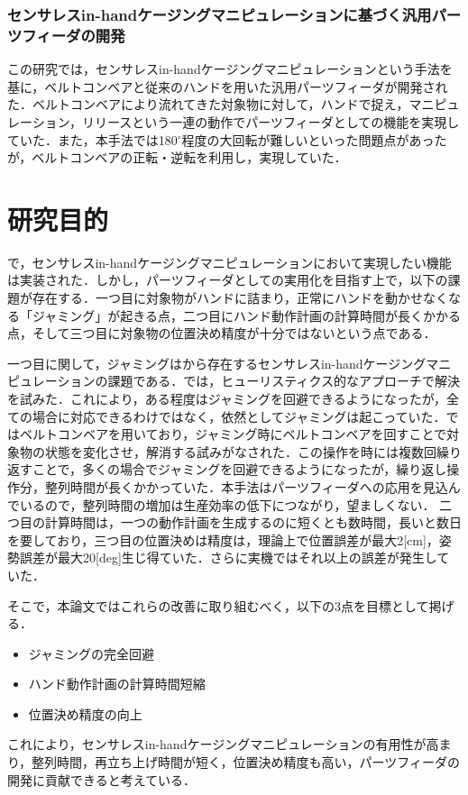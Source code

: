 \documentclass[a4paper,twoside,12pt,papersize, dvipdfmx]{iirthesis}
\begin{document}
\subsubsection{センサレスin-handケージングマニピュレーションに基づく汎用パーツフィーダの開発 \cite{Kamikukita2022}}
この研究では，センサレスin-handケージングマニピュレーションという手法を基に，ベルトコンベアと従来のハンドを用いた汎用パーツフィーダが開発された．ベルトコンベアにより流れてきた対象物に対して，ハンドで捉え，マニピュレーション，リリースという一連の動作でパーツフィーダとしての機能を実現していた．また，本手法では180$^\circ$程度の大回転が難しいといった問題点があったが，ベルトコンベアの正転・逆転を利用し，実現していた．

\section{研究目的}\label{sec::intro::objective}
\cite{komiyama2020}で，センサレスin-handケージングマニピュレーションにおいて実現したい機能は実装された．しかし，パーツフィーダとしての実用化を目指す上で，以下の課題が存在する．一つ目に対象物がハンドに詰まり，正常にハンドを動かせなくなる「ジャミング」が起きる点，二つ目にハンド動作計画の計算時間が長くかかる点，そして三つ目に対象物の位置決め精度が十分ではないという点である．\par

一つ目に関して，ジャミングは\cite{asamura2013}から存在するセンサレスin-handケージングマニピュレーションの課題である．\cite{komiyama2020}では，ヒューリスティクス的なアプローチで解決を試みた．これにより，ある程度はジャミングを回避できるようになったが，全ての場合に対応できるわけではなく，依然としてジャミングは起こっていた．\cite{kamikukita2021}ではベルトコンベアを用いており，ジャミング時にベルトコンベアを回すことで対象物の状態を変化させ，解消する試みがなされた．この操作を時には複数回繰り返すことで，多くの場合でジャミングを回避できるようになったが，繰り返し操作分，整列時間が長くかかっていた．本手法はパーツフィーダへの応用を見込んでいるので，整列時間の増加は生産効率の低下につながり，望ましくない．
二つ目の計算時間は，一つの動作計画を生成するのに短くとも数時間，長いと数日を要しており，三つ目の位置決めは精度は，理論上で位置誤差が最大2[cm]，姿勢誤差が最大20[deg]生じ得ていた．さらに実機ではそれ以上の誤差が発生していた．\par

そこで，本論文ではこれらの改善に取り組むべく，以下の3点を目標として掲げる．
\begin{itemize}
\item ジャミングの完全回避
\item ハンド動作計画の計算時間短縮
\item 位置決め精度の向上
\end{itemize}
これにより，センサレスin-handケージングマニピュレーションの有用性が高まり，整列時間，再立ち上げ時間が短く，位置決め精度も高い，パーツフィーダの開発に貢献できると考えている．
\end{document}
